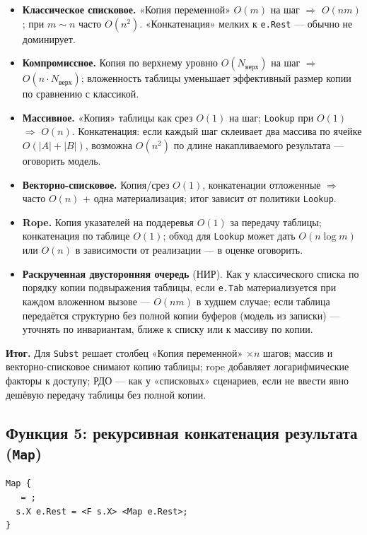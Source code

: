 \documentclass[12pt,a4paper]{article}
\newcommand{\bigO}{\ensuremath{O}}
\begin{document}
\begin{itemize}
  \item \textbf{Классическое списковое.} «Копия переменной» \(O(m)\) на шаг \(\Rightarrow\) \(\bigO(nm)\); при \(m\sim n\) часто \(\bigO(n^2)\). «Конкатенация» мелких к \texttt{e.Rest} --- обычно не доминирует.
  \item \textbf{Компромиссное.} Копия по верхнему уровню \(O(N_{\text{верх}})\) на шаг \(\Rightarrow\) \(\bigO(n\cdot N_{\text{верх}})\); вложенность таблицы уменьшает эффективный размер копии по сравнению с классикой.
  \item \textbf{Массивное.} «Копия» таблицы как срез \(O(1)\) на шаг; \texttt{Lookup} при \(O(1)\) \(\Rightarrow\) \(\bigO(n)\). Конкатенация: если каждый шаг склеивает два массива по ячейке \(O(|A|+|B|)\), возможна \(\bigO(n^2)\) по длине накапливаемого результата --- оговорить модель.
  \item \textbf{Векторно-списковое.} Копия/срез \(O(1)\), конкатенации отложенные \(\Rightarrow\) часто \(\bigO(n)\) + одна материализация; итог зависит от политики \texttt{Lookup}.
  \item \textbf{Rope.} Копия указателей на поддеревья \(O(1)\) за передачу таблицы; конкатенация по таблице \(O(1)\); обход для \texttt{Lookup} может дать \(\bigO(n\log m)\) или \(\bigO(n)\) в зависимости от реализации --- в оценке оговорить.
  \item \textbf{Раскрученная двусторонняя очередь} (НИР). Как у классического списка по порядку копии подвыражения таблицы, если \texttt{e.Tab} материализуется при каждом вложенном вызове --- \(\bigO(nm)\) в худшем случае; если таблица передаётся структурно без полной копии буферов (модель из записки) --- уточнять по инвариантам, ближе к списку или к массиву по копии.
\end{itemize}

\textbf{Итог.} Для \texttt{Subst} решает столбец «Копия переменной» \(\times n\) шагов; массив и векторно-списковое снимают копию таблицы; rope добавляет логарифмические факторы к доступу; РДО --- как у «списковых» сценариев, если не ввести явно дешёвую передачу таблицы без полной копии.

\subsection{Функция 5: рекурсивная конкатенация результата (\texttt{Map})}

\begin{lstlisting}
Map {
   = ;
  s.X e.Rest = <F s.X> <Map e.Rest>;
}
\end{lstlisting}
\end{document}
